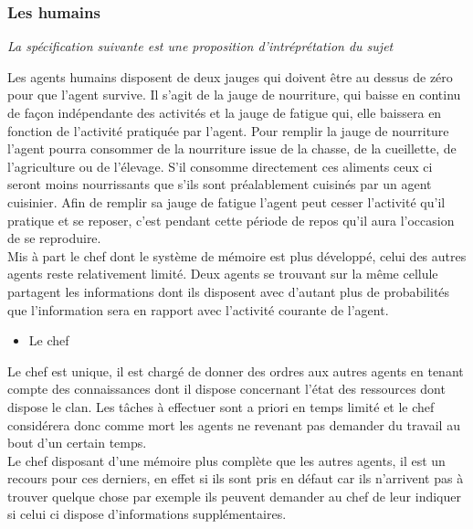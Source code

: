 \documentclass[12pt]{article}
\begin{document}
		\subsubsection{Les humains}

\textit{La spécification suivante est une proposition d'intréprétation du 
sujet}

Les agents humains disposent de deux jauges qui doivent être au dessus de 
zéro pour que l'agent survive. Il s'agit de la jauge de nourriture, qui baisse 
en continu de façon indépendante des activités et la jauge de fatigue qui, 
elle baissera en fonction de l'activité pratiquée par l'agent. Pour remplir 
la jauge de nourriture l'agent pourra consommer de la nourriture issue de la 
chasse, de la cueillette, de l'agriculture ou de l'élevage. S'il consomme 
directement ces aliments ceux ci seront moins nourrissants que s'ils sont 
préalablement cuisinés par un agent cuisinier. Afin de remplir sa jauge de 
fatigue l'agent peut cesser l'activité qu'il pratique et se reposer, c'est 
pendant cette période de repos qu'il aura l'occasion de se reproduire.\\

Mis à part le chef dont le système de mémoire est plus développé, celui des 
autres agents reste relativement limité. Deux agents se trouvant sur la même 
cellule partagent les informations dont ils disposent avec d'autant plus de 
probabilités que l'information sera en rapport avec l'activité courante de 
l'agent.

		\begin{itemize}
		\item Le chef\\
		\end{itemize}

Le chef est unique, il est chargé de donner des ordres aux autres agents en 
tenant compte des connaissances dont il dispose concernant l'état des 
ressources dont dispose le clan. Les tâches à effectuer sont a priori en temps 
limité et le chef considérera donc comme mort les agents ne revenant pas 
demander du travail au bout d'un certain temps.\\

Le chef disposant d'une mémoire plus complète que les autres agents, il est un 
recours pour ces derniers, en effet si ils sont pris en défaut car ils 
n'arrivent pas à trouver quelque chose par exemple ils peuvent demander au 
chef de leur indiquer si celui ci dispose d'informations supplémentaires.\\
\end{document}
